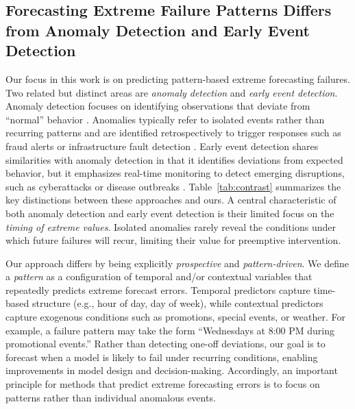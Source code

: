 \documentclass[]{interact}
\theoremstyle{plain}
\theoremstyle{definition}
\theoremstyle{remark}
\begin{document}
\subsection{Forecasting Extreme Failure Patterns Differs from Anomaly Detection and Early Event Detection}
\label{sec-contrasting}
Our focus in this work is on predicting pattern-based extreme forecasting failures.
Two related but distinct areas are \emph{anomaly detection} and \emph{early event detection}. Anomaly detection focuses on identifying observations that deviate from ``normal'' behavior \citep{chandola2009, nassif2021}. Anomalies typically refer to isolated events rather than recurring patterns and are identified retrospectively to trigger responses such as fraud alerts or infrastructure fault detection \citep{patcha2007, akouemo2016}.
Early event detection shares similarities with anomaly detection in that it identifies deviations from expected behavior, but it emphasizes real-time monitoring to detect emerging disruptions, such as cyberattacks or disease outbreaks \citep{wang2021, deljac2015, shmueli2010}. Table~\ref{tab:contrast} summarizes the key distinctions between these approaches and ours. A central characteristic of both anomaly detection and early event detection is their limited focus on the \emph{timing of extreme values}. Isolated anomalies rarely reveal the conditions under which future failures will recur, limiting their value for preemptive intervention.

Our approach differs by being explicitly \emph{prospective} and \emph{pattern-driven}. We define a \emph{pattern} as a configuration of temporal and/or contextual variables that repeatedly predicts extreme forecast errors. Temporal predictors capture time-based structure (e.g., hour of day, day of week), while contextual predictors capture exogenous conditions such as promotions, special events, or weather. For example, a failure pattern may take the form ``Wednesdays at 8:00 PM during promotional events.'' Rather than detecting one-off deviations, our goal is to forecast when a model is likely to fail under recurring conditions, enabling improvements in model design and decision-making. Accordingly, an important principle for methods that predict extreme forecasting errors is to focus on patterns rather than individual anomalous events.
\end{document}
